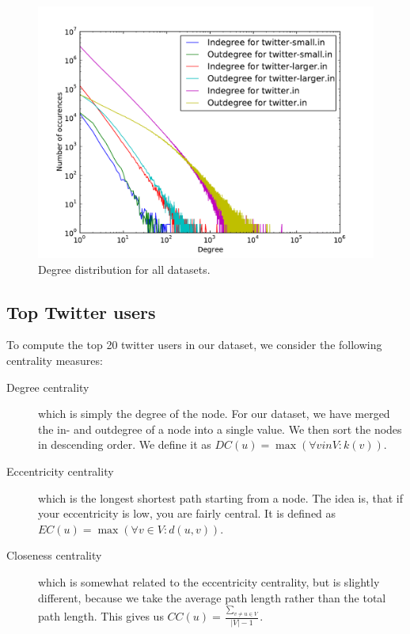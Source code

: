 \documentclass[a4paper,10pt,hidelinks]{article}
\begin{document}
\begin{figure}
	\centering
	\includegraphics[scale=0.8]{degree-distributions.pdf}
	\caption{Degree distribution for all datasets.}
\end{figure}

\subsection{Top Twitter users}
To compute the top 20 twitter users in our dataset, we consider the following centrality measures:

\begin{description}
	\item[Degree centrality] which is simply the degree of the node. For our dataset, we have merged the in- and outdegree of a node into a single value. We then sort the nodes in descending order. We define it as $DC(u) = \max(\forall v in V : k(v))$.

	\item[Eccentricity centrality] which is the longest shortest path starting from a node. The idea is, that if your eccentricity is low, you are fairly central. It is defined as $EC(u) = \max(\forall v \in V : d(u, v))$.

	\item[Closeness centrality] which is somewhat related to the eccentricity centrality, but is slightly different, because we take the average path length rather than the total path length. This gives us $CC(u) = \frac{\sum_{v \neq u \in V}}{|V| - 1}$.
\end{description}
\end{document}
